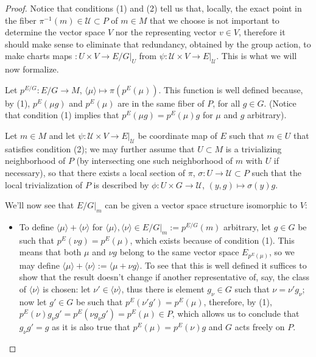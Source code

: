 \begin{proof}
Notice that conditions (1) and (2) tell us that, locally, the exact point in the fiber $\pi^{-1}(m) \in \mathcal U \subset P$ of $m \in M$ that we choose is not important to determine the vector space $V$ nor the representing vector $v \in V$, therefore it should make sense to eliminate that redundancy, obtained by the group action, to make charts maps $:U \times V \to E/G|_U$ from $\psi:\mathcal U \times V \to E|_{\mathcal U}$. This is what we will now formalize.

Let $p^{E/G}: E/G \to M$, $\langle \mu \rangle \mapsto \pi(p^E(\mu))$. This function is well defined because, by (1), $p^E(\mu g)$ and $p^E(\mu)$ are in the same fiber of $P$, for all $g \in G$. (Notice that condition (1) implies that $p^E(\mu g) = p^E(\mu) g$ for $\mu$ and $g$ arbitrary).

Let $m \in M$ and let $\psi: \mathcal U \times V \to E|_{\mathcal U}$ be coordinate map of $E$  such that $m \in U$ that satisfies condition (2); we may further assume that $U \subset M$ is a trivializing neighborhood of $P$ (by intersecting one such neighborhood of $m$ with $U$ if necessary), so that there exists a local section of $\pi$, $\sigma: U \to \mathcal U \subset P$ such that the local trivialization of $P$ is described by $\phi: U\times G \to \mathcal U$, $(y, g) \mapsto \sigma(y)g$.

We'll now see that $E/G|_m$ can be given a vector space structure isomorphic to $V$:
\begin{itemize}
    \item To define $\langle \mu \rangle + \langle \nu \rangle$ for $\langle \mu \rangle, \langle \nu \rangle \in E/G|_m := p^{E/G}(m)$ arbitrary, let $g \in G$ be such that $p^E(\nu g) = p^E(\mu)$, which exists because of condition (1). This means that both $\mu$ and $\nu g$ belong to the same vector space $E_{p^E(\mu)}$, so we may define $\langle \mu \rangle + \langle \nu \rangle := \langle \mu + \nu g \rangle$. To see that this is well defined it suffices to show that the result doesn't change if another representative of, say, the class of $\langle \nu \rangle$ is chosen: let $\nu' \in \langle \nu \rangle$, thus there is element $g_\nu \in G$ such that $\nu = \nu' g_\nu$; now let $g' \in G$ be such that $p^E(\nu' g') = p^E(\mu)$, therefore, by (1), $p^E(\nu) g_\nu g' = p^E(\nu g_\nu g') = p^E(\mu) \in P$, which allows us to conclude that $g_\nu g' = g$ as it is also true that $p^E(\mu) = p^E(\nu)g$ and $G$ acts freely on $P$.
    

\end{itemize}
\end{proof}
